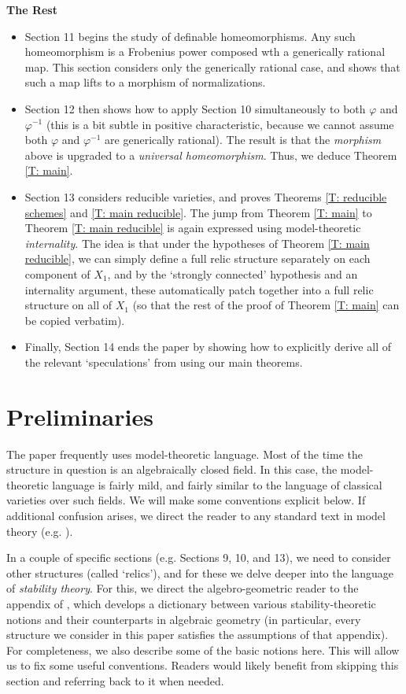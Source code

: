 \documentclass{amsart}
\theoremstyle{definition}
\begin{document}
\textbf{The Rest}

\begin{itemize}
    \item Section 11 begins the study of definable homeomorphisms. Any such homeomorphism is a Frobenius power composed wth a generically rational map. This section considers only the generically rational case, and shows that such a map lifts to a morphism of normalizations.
    \item Section 12 then shows how to apply Section 10 simultaneously to both $\varphi$ and $\varphi^{-1}$ (this is a bit subtle in positive characteristic, because we cannot assume both $\varphi$ and $\varphi^{-1}$ are generically rational). The result is that the \textit{morphism} above is upgraded to a \textit{universal homeomorphism}. Thus, we deduce Theorem \ref{T: main}.
    \item Section 13 considers reducible varieties, and proves Theorems \ref{T: reducible schemes} and \ref{T: main reducible}. The jump from Theorem \ref{T: main} to Theorem \ref{T: main reducible} is again expressed using model-theoretic \textit{internality}. The idea is that under the hypotheses of Theorem \ref{T: main reducible}, we can simply define a full relic structure separately on each component of $X_1$, and by the `strongly connected' hypothesis and an internality argument, these automatically patch together into a full relic structure on all of $X_1$ (so that the rest of the proof of Theorem \ref{T: main} can be copied verbatim). 
    \item Finally, Section 14 ends the paper by showing how to explicitly derive all of the relevant `speculations' from \cite{KLOS} using our main theorems.
\end{itemize}

\section{Preliminaries}

The paper frequently uses model-theoretic language. Most of the time the structure in question is an algebraically closed field. In this case, the model-theoretic language is fairly mild, and fairly similar to the language of classical varieties over such fields. We will make some conventions explicit below. If additional confusion arises, we direct the reader to any standard text in model theory (e.g. \cite{MaBook}).

In a couple of specific sections (e.g. Sections 9, 10, and 13), we need to consider other structures (called `relics'), and for these we delve deeper into the language of \textit{stability theory}. For this, we direct the algebro-geometric reader to the appendix of \cite{CasHasAV}, which develops a dictionary between various stability-theoretic notions and their counterparts in algebraic geometry (in particular, every structure we consider in this paper satisfies the assumptions of that appendix). For completeness, we also describe some of the basic notions here. This will allow us to fix some useful conventions. Readers would likely benefit from skipping this section and referring back to it when needed.
\end{document}
